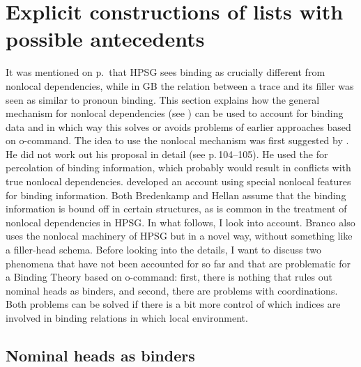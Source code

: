 \documentclass[output=paper,biblatex,babelshorthands,newtxmath,draftmode,colorlinks,citecolor=brown]{langscibook}
\begin{document}
\section{Explicit constructions of lists with possible antecedents}
\label{sec-bt-nonlocal}

It was mentioned on p.\,\pageref{page-traces-binding} that HPSG sees binding as crucially different from nonlocal
dependencies, while in GB the relation between a trace and its filler was seen as similar to pronoun
binding. This section explains how the general mechanism for nonlocal dependencies (see
) can be used to account for binding data and in which way this solves or
avoids problems of earlier approaches based on o-command. 
The idea to use the nonlocal mechanism was first suggested by
\citet[Section~7.2.3]{Bredenkamp96a}. He did not work out his proposal in detail (see 
p.\,104--105). He used the \slashf for percolation of binding information, which probably would
result in conflicts with true nonlocal dependencies. \citet{Hellan2005a} developed an account using
special nonlocal features for binding information. Both Bredenkamp and Hellan assume that the
binding information is bound off in certain structures, as is common in the treatment of nonlocal
dependencies in HPSG. In what follows, I look into  account. Branco also
uses the nonlocal machinery of HPSG but in a novel way, without something like a filler-head
schema. Before looking into the details, I want to discuss two phenomena that have not been
accounted for so far and that are problematic for a Binding Theory based on o-command: first, there
is nothing that rules out nominal heads as binders, and second, there are problems with
coordinations. Both problems can be solved if there is a bit more control of which indices are
involved in binding relations in which local environment.


\subsection{Nominal heads as binders}
\label{sec-nominal-heads-as-binders}

\end{document}
